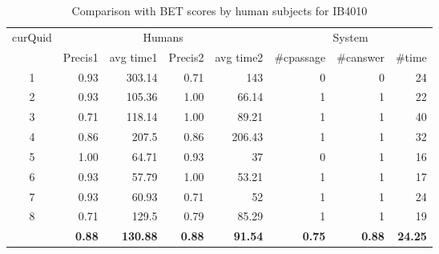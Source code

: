 \begin{table}[htb!]
\scriptsize
\caption{Comparison with BET scores by human subjects for IB4010}
\begin{tabular}{|c|r|r|r|r|r|r|r|}
\hline
\multicolumn{ 1}{|c|}{curQuid} & \multicolumn{ 4}{c|}{Humans} & \multicolumn{ 3}{c|}{System} \\ \cline{ 2- 8}
\multicolumn{ 1}{|l|}{} & \multicolumn{1}{c|}{Precis1} & \multicolumn{1}{c|}{avg time1} & \multicolumn{1}{c|}{Precis2} & \multicolumn{1}{c|}{avg time2} & \multicolumn{1}{c|}{\#cpassage} & \multicolumn{1}{c|}{\#canswer} & \multicolumn{1}{c|}{\#time } \\ \hline
1 & 0.93 & 303.14 & 0.71 & 143 & 0 & 0 & 24 \\ \hline
2 & 0.93 & 105.36 & 1.00 & 66.14 & 1 & 1 & 22 \\ \hline
3 & 0.71 & 118.14 & 1.00 & 89.21 & 1 & 1 & 40 \\ \hline
4 & 0.86 & 207.5 & 0.86 & 206.43 & 1 & 1 & 32 \\ \hline
5 & 1.00 & 64.71 & 0.93 & 37 & 0 & 1 & 16 \\ \hline
6 & 0.93 & 57.79 & 1.00 & 53.21 & 1 & 1 & 17 \\ \hline
7 & 0.93 & 60.93 & 0.71 & 52 & 1 & 1 & 24 \\ \hline
8 & 0.71 & 129.5 & 0.79 & 85.29 & 1 & 1 & 19 \\ \hline
\multicolumn{1}{|l|}{} & \textbf{0.88} & \textbf{130.88} & \textbf{0.88} & \textbf{91.54} & \textbf{0.75} & \textbf{0.88} & \textbf{24.25} \\ \hline
\end{tabular}
\label{table: BET scores for IB4010}
\end{table}

 




